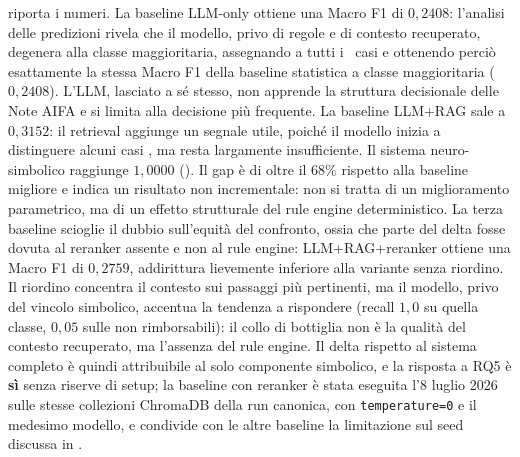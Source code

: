  riporta i numeri. La baseline LLM-only ottiene una Macro F1 di $0{,}2408$: l'analisi delle predizioni rivela che il modello, privo di regole e di contesto recuperato, degenera alla classe maggioritaria, assegnando  a tutti i \goldn\ casi e ottenendo perciò esattamente la stessa Macro F1 della baseline statistica a classe maggioritaria ($0{,}2408$). L'LLM, lasciato a sé stesso, non apprende la struttura decisionale delle Note AIFA e si limita alla decisione più frequente. La baseline LLM+RAG sale a $0{,}3152$: il retrieval aggiunge un segnale utile, poiché il modello inizia a distinguere alcuni casi , ma resta largamente insufficiente. Il sistema neuro-simbolico raggiunge $1{,}0000$ (). Il gap è di oltre il $68\%$ rispetto alla baseline migliore e indica un risultato non incrementale: non si tratta di un miglioramento parametrico, ma di un effetto strutturale del rule engine deterministico. La terza baseline scioglie il dubbio sull'equità del confronto, ossia che parte del delta fosse dovuta al reranker assente e non al rule engine: LLM+RAG+reranker ottiene una Macro F1 di $0{,}2759$, addirittura lievemente inferiore alla variante senza riordino. Il riordino concentra il contesto sui passaggi più pertinenti, ma il modello, privo del vincolo simbolico, accentua la tendenza a rispondere  (recall $1{,}0$ su quella classe, $0{,}05$ sulle non rimborsabili): il collo di bottiglia non è la qualità del contesto recuperato, ma l'assenza del rule engine. Il delta rispetto al sistema completo è quindi attribuibile al solo componente simbolico, e la risposta a RQ5 è \textbf{sì} senza riserve di setup; la baseline con reranker è stata eseguita l'8 luglio 2026 sulle stesse collezioni ChromaDB della run canonica, con \texttt{temperature=0} e il medesimo modello, e condivide con le altre baseline la limitazione sul seed discussa in .

